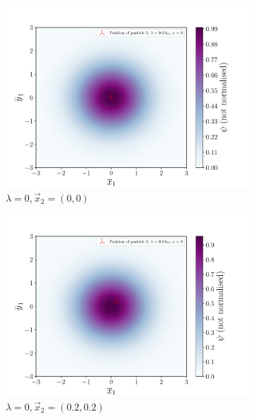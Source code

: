 \documentclass[a4paper,DIV=12,english]{scrartcl}
\begin{document}
\begin{figure}
    \centering
    \begin{subfigure}{0.32\textwidth}
        \centering
        \includegraphics[width=\textwidth]{../plots/wf/wf_0_0_lambda0.pdf}
        \caption{$\lambda=0, \vec{x}_2 = (0, 0)$}
        \label{subfig:wf_0_0_0}
    \end{subfigure}
    \begin{subfigure}{0.32\textwidth}
        \centering
        \includegraphics[width=\textwidth]{../plots/wf/wf_02_02_lambda0.pdf}
        \caption{$\lambda=0, \vec{x}_2 = (0.2, 0.2)$}
        \label{subfig:wf_02_02_0}
    \end{subfigure}
    \begin{subfigure}{0.32\textwidth}

\end{subfigure}
\end{figure}
\end{document}
